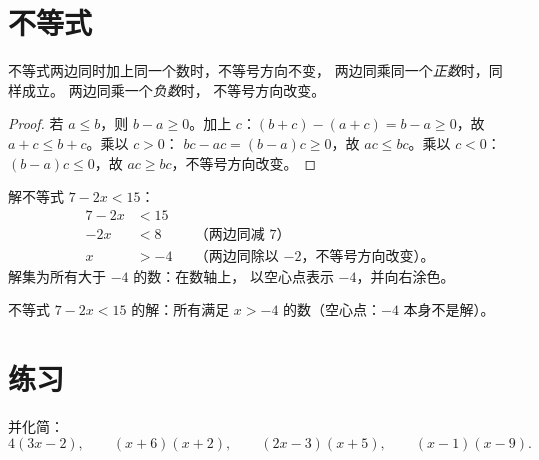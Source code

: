 \section{不等式}

\begin{proposition}[不等式的性质]\label{prop:g9:algebra:ineq}
不等式两边同时加上同一个数时，不等号方向不变，
两边同乘同一个\emph{正数}时，同样成立。
两边同乘一个\emph{负数}时，
不等号方向改变。
\end{proposition}

\begin{proof}
若 $a \leq b$，则 $b - a \geq 0$。加上 $c$：$(b+c) - (a+c) = b - a
\geq 0$，故 $a + c \leq b + c$。乘以 $c > 0$：
$bc - ac = (b-a)c \geq 0$，故 $ac \leq bc$。乘以 $c < 0$：
$(b-a)c \leq 0$，故 $ac \geq bc$，不等号方向改变。
\end{proof}

\begin{example}\label{ex:g9:algebra:ineq}
解不等式 $7 - 2x < 15$：
\begin{align*}
7 - 2x &< 15 \\
-2x &< 8 && \text{（两边同减 7）} \\
x &> -4 && \text{（两边同除以 $-2$，不等号方向改变）。}
\end{align*}
解集为所有大于 $-4$ 的数：在数轴上，
以空心点表示 $-4$，并向右涂色。
\end{example}

\begin{omfigure}

{\small 不等式 $7 - 2x < 15$ 的解：所有满足 $x > -4$ 的数（空心点：$-4$
本身不是解）。}
\end{omfigure}

\section{练习}

\begin{exercise}[$\star$]\label{exo:g9:algebra:1}
并化简：
\[
4(3x - 2), \qquad
(x + 6)(x + 2), \qquad
(2x - 3)(x + 5), \qquad
(x - 1)(x - 9).
\]
\end{exercise}

